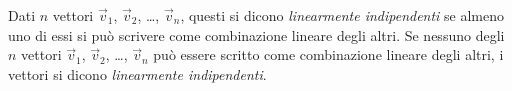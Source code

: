 \ovalbox{\risolvi \ref{ese:F.8}}

\begin{definizione}
Dati $n$ vettori $\vec{v}_1$, $\vec{v}_2$, \ldots, $\vec{v}_n$, questi si dicono \emph{linearmente indipendenti} se almeno uno di essi si può scrivere come combinazione lineare degli altri. Se nessuno degli $n$ vettori $\vec{v}_1$, $\vec{v}_2$, \ldots, $\vec{v}_n$ può essere scritto come combinazione lineare degli altri, i vettori si dicono \emph{linearmente indipendenti}.
\end{definizione}

\vspazio\ovalbox{\risolvii \ref{ese:F.9}, \ref{ese:F.10}}

\newpage

\cleardoublepage
